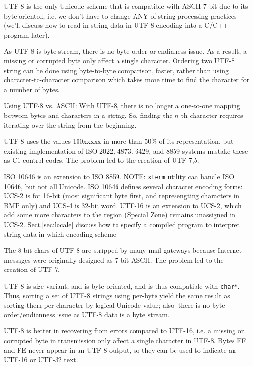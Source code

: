 \begin{mdframed}
UTF-8 is the only Unicode scheme that is compatible with ASCII 7-bit due to its
byte-oriented, i.e. we don't have to change ANY of string-processing practices
(we'll discuss how to read in string data in UTF-8 encoding into a C/C++ program later). 

As UTF-8 is byte stream, there is no byte-order or endianess issue. As a result,
a missing or corrupted byte only affect a single character. Ordering two UTF-8
string can be done using byte-to-byte comparison, faster, rather than using
character-to-character comparison which takes more time to find the character
for a number of bytes.

Using UTF-8 vs. ASCII: With UTF-8, there is no longer a one-to-one mapping
between bytes and characters in a string. So, finding the $n$-th character
requires iterating over the string from the beginning.

\end{mdframed}


\begin{mdframed}

UTF-8 uses the values 100xxxxx in more than 50\% of its representation, but
existing implementation of ISO 2022, 4873, 6429, and 8859 systems mistake these
as C1 control codes. The problem led to the creation of UTF-7,5.

ISO 10646 is an extension to ISO 8859. NOTE: \verb!xterm! utility can handle ISO
10646, but not all Unicode. ISO 10646 defines several character encoding forms:
UCS-2 is for 16-bit (most significant byte first, and represengting characters
in BMP only) and UCS-4 is 32-bit word. UTF-16 is an extension to UCS-2, which
add some more characters to the region (Special Zone) remains unassigned in
UCS-2. Sect.\ref{sec:locale} discuss how to specify a compiled program to
interpret string data in which encoding scheme.

The 8-bit chars of UTF-8 are stripped by many mail gateways because Internet
messages were originally designed as 7-bit ASCII. The problem led to the
creation of UTF-7.
\end{mdframed}

UTF-8 is size-variant, and is byte oriented, and is thus
compatible with \verb!char*!. Thus, sorting a set of UTF-8 strings using
per-byte yield the same result as sorting them per-character by logical Unicode
value; also, there is no byte-order/endianness issue as UTF-8 data is a byte
stream.

UTF-8 is better in recovering from errors compared to UTF-16, i.e. a missing or
corrupted byte in transmission only affect a single character in UTF-8.
Bytes FF and FE never appear in an UTF-8 output, so they can be used to indicate
an UTF-16 or UTF-32 text.

